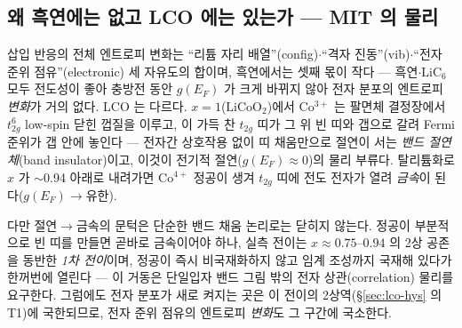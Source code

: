 \subsection{왜 흑연에는 없고 LCO 에는 있는가 --- MIT 의 물리}\label{sec:lco-why}
삽입 반응의 전체 엔트로피 변화는 ``리튬 자리 배열''(config)$\cdot$``격자 진동''(vib)$\cdot$``전자 준위 점유''(electronic)
세 자유도의 합이며, 흑연에서는 셋째 몫이 작다 --- 흑연$\cdot$$\mathrm{LiC_6}$ 모두 전도성이 좋아 충방전 동안 $g(E_F)$ 가
크게 바뀌지 않아 전자 분포의 엔트로피 \emph{변화}가 거의 없다. LCO 는 다르다.
$x{=}1$($\mathrm{LiCoO_2}$)에서 Co$^{3+}$ 는 팔면체 결정장에서 $t_{2g}^6$ low-spin 닫힌 껍질을 이루고, 이 가득 찬
$t_{2g}$ 띠가 그 위 빈 띠와 갭으로 갈려 Fermi 준위가 갭 안에 놓인다 --- 전자간 상호작용 없이 띠 채움만으로 절연이
서는 \emph{밴드 절연체}(band insulator)이고, 이것이 전기적 절연($g(E_F)\!\approx\!0$)의 물리 부류다\cite{menetrier1999,motohashi2009}.
탈리튬화로 $x$ 가 $\sim$0.94 아래로 내려가면 Co$^{4+}$ 정공이 생겨 $t_{2g}$ 띠에 전도 전자가 열려 \emph{금속}이
된다($g(E_F)\!\to\!$유한).

다만 절연$\to$금속의 문턱은 단순한 밴드 채움 논리로는 닫히지 않는다. 정공이 부분적으로 빈 띠를 만들면 곧바로
금속이어야 하나, 실측 전이는 $x\approx0.75$--$0.94$ 의 2상 공존을 동반한 \emph{1차 전이}이며, 정공이 즉시
비국재화하지 않고 임계 조성까지 국재해 있다가 한꺼번에 열린다\cite{reimers1992,motohashi2009} --- 이 거동은
단일입자 밴드 그림 밖의 전자 상관(correlation) 물리를 요구한다. 그럼에도 전자 분포가 새로 켜지는 곳은 이 전이의
2상역(\S\ref{sec:lco-hys} 의 T1)에 국한되므로, 전자 준위 점유의 엔트로피 \emph{변화}도 그 구간에 국소한다.


